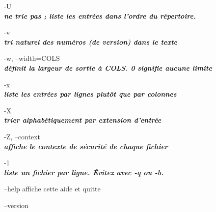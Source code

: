 \documentclass{article}
\begin{document}
      \par -U \\
		 \textit{\textbf{ne trie pas ; liste les entrées dans l'ordre du répertoire.}}\\

       \par-v\\
		 \textit{\textbf{ tri naturel des numéros (de version) dans le texte}}\\

       \par-w, --width=COLS\\
              \textit{\textbf{définit la largeur de sortie à COLS.  0 signifie aucune limite}}\\

      \par -x\\
		\textit{\textbf{ liste les entrées par lignes plutôt que par colonnes}}\\

      \par -X\\
	 \textit{\textbf{trier alphabétiquement par extension d'entrée}}\\

       \par-Z, --context\\
              \textit{\textbf{ affiche le contexte de sécurité de chaque fichier}}\\

        \par-1 \\
		\textit{\textbf{liste un fichier par ligne.  Évitez  avec -q ou -b.}}\\

       \par--help affiche cette aide et quitte\\

        \par--version\\
\end{document}
